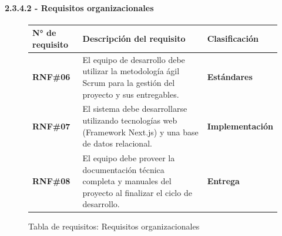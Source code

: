 \paragraph{2.3.4.2 - Requisitos organizacionales}

\begin{figure}[H]
    \centering
    \begin{tabularx}{\textwidth}{|l|X|l|}
    \hline
        \textbf{N° de requisito} 
        
        & \textbf{Descripción del requisito} 
        
        & \textbf{Clasificación} 
        
    \\ \hline
    
        \textbf{RNF\#06} 
        
        & El equipo de desarrollo debe utilizar la metodología ágil Scrum para la gestión del proyecto y sus entregables. 
        
        & \textbf{Estándares} 
        
    \\ \hline
    
        \textbf{RNF\#07} 
        
        & El sistema debe desarrollarse utilizando tecnologías web (Framework Next.js) y una base de datos relacional. 
        
        & \textbf{Implementación} 
        
    \\ \hline
    
        \textbf{RNF\#08} 
        
        & El equipo debe proveer la documentación técnica completa y manuales del proyecto al finalizar el ciclo de desarrollo. 
        
        & \textbf{Entrega} 
        
    \\ \hline
    \end{tabularx}
    \caption{Tabla de requisitos: Requisitos organizacionales}
\end{figure}
